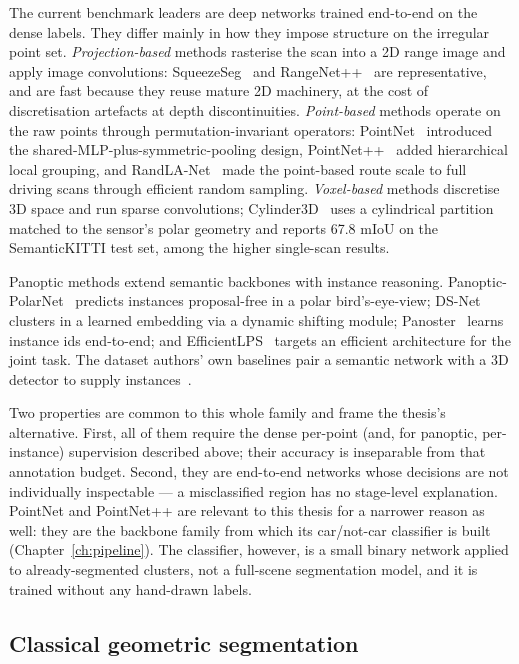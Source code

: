 The current benchmark leaders are deep networks trained end-to-end on the dense labels.
They differ mainly in how they impose structure on the irregular point set.
\emph{Projection-based} methods rasterise the scan into a 2D range image and apply
image convolutions: SqueezeSeg~\cite{10.1109/ICRA.2018.8462926} and
RangeNet++~\cite{milioto2019rangenet++} are representative, and are fast because they
reuse mature 2D machinery, at the cost of discretisation artefacts at depth
discontinuities. \emph{Point-based} methods operate on the raw points through
permutation-invariant operators: PointNet~\cite{Qi_2017_CVPR} introduced the
shared-MLP-plus-symmetric-pooling design, PointNet++~\cite{NIPS2017_d8bf84be} added
hierarchical local grouping, and RandLA-Net~\cite{Hu_2020_CVPR} made the point-based
route scale to full driving scans through efficient random sampling. \emph{Voxel-based}
methods discretise 3D space and run sparse convolutions; Cylinder3D~\cite{zhu2021cylindrical}
uses a cylindrical partition matched to the sensor's polar geometry and reports
\num{67.8} mIoU on the SemanticKITTI test set, among the higher single-scan results.

Panoptic methods extend semantic backbones with instance reasoning.
Panoptic-PolarNet~\cite{zhou2021panopticpolarnet} predicts instances proposal-free in a
polar bird's-eye-view; DS-Net~\cite{hong2021dsnet} clusters in a learned embedding via a
dynamic shifting module; Panoster~\cite{gasperini2021panoster} learns instance ids
end-to-end; and EfficientLPS~\cite{sirohi2021efficientlps} targets an efficient
architecture for the joint task. The dataset authors' own baselines pair a semantic
network with a 3D detector to supply instances~\cite{behley2021panoptic}.

Two properties are common to this whole family and frame the thesis's alternative.
First, all of them require the dense per-point (and, for panoptic, per-instance)
supervision described above; their accuracy is inseparable from that annotation budget.
Second, they are end-to-end networks whose decisions are not individually inspectable
--- a misclassified region has no stage-level explanation. PointNet and PointNet++ are
relevant to this thesis for a narrower reason as well: they are the backbone family from
which its car/not-car classifier is built (Chapter~\ref{ch:pipeline}). The classifier, however, is a
small binary network applied to already-segmented clusters, not a full-scene
segmentation model, and it is trained without any hand-drawn labels.

\subsection{Classical geometric segmentation}
\label{sec:bg-classical}

